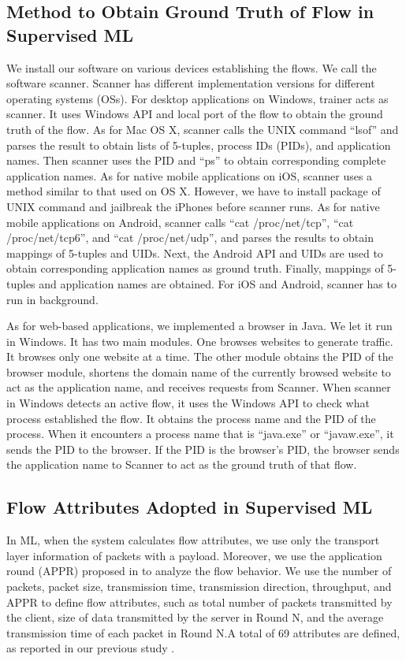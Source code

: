 \documentclass[10pt,journal]{IEEEtran}
\begin{document}
\subsection{Method to Obtain Ground Truth of Flow in Supervised ML}
We install our software on various devices establishing the flows. We call the software scanner. Scanner has different implementation versions for different operating systems (OSs). For desktop applications on Windows, trainer acts as scanner. It uses Windows API and local port of the flow to obtain the ground truth of the flow. As for Mac OS X, scanner calls the UNIX command ``lsof'' and parses the result to obtain lists of 5-tuples, process IDs (PIDs), and application names. Then scanner uses the PID and ``ps'' to obtain corresponding complete application names. As for native mobile applications on iOS, scanner uses a method similar to that used on OS X. However, we have to install package of UNIX command and jailbreak the iPhones before scanner runs.  As for native mobile applications on Android, scanner calls ``cat /proc/net/tcp'', ``cat /proc/net/tcp6'', and ``cat /proc/net/udp'', and parses the results to obtain mappings of 5-tuples and UIDs. Next, the Android API and UIDs are used to obtain corresponding application names as ground truth. Finally, mappings of 5-tuples and application names are obtained. For iOS and Android, scanner has to run in background.

As for web-based applications, we implemented a browser in Java. We let it run in Windows. It has two main modules. One browses websites to generate traffic. It browses only one website at a time. The other module obtains the PID of the browser module, shortens the domain name of the currently browsed website to act as the application name, and receives requests from Scanner. When scanner in Windows detects an active flow, it uses the Windows API to check what process established the flow. It obtains the process name and the PID of the process. When it encounters a process name that is ``java.exe'' or ``javaw.exe'', it sends the PID to the browser. If the PID is the browser’s PID, the browser sends the application name to Scanner to act as the ground truth of that flow.

\subsection{Flow Attributes Adopted in Supervised ML}
In ML, when the system calculates flow attributes, we use only the transport layer information of packets with a payload. Moreover, we use the application round (APPR) proposed in \cite{classfication-cloud} to analyze the flow behavior. We use the number of packets, packet size, transmission time, transmission direction, throughput, and APPR to define flow attributes, such as total number of packets transmitted by the client, size of data transmitted by the server in Round N, and the average transmission time of each packet in Round N.A total of 69 attributes are defined, as reported in our previous study \cite{Chia-Chin-master}.
\end{document}
